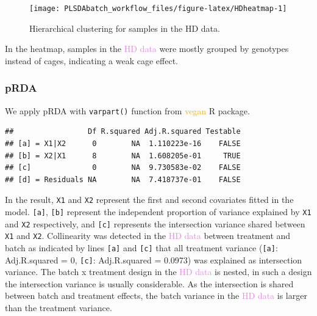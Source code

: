 \documentclass[
]{book}
\newenvironment{Shaded}{\begin{snugshade}}{\end{snugshade}}
\newcommand{\AttributeTok}[1]{\textcolor[rgb]{0.77,0.63,0.00}{#1}}
\newcommand{\FunctionTok}[1]{\textcolor[rgb]{0.00,0.00,0.00}{#1}}
\newcommand{\NormalTok}[1]{#1}
\newcommand{\OtherTok}[1]{\textcolor[rgb]{0.56,0.35,0.01}{#1}}
\newcommand{\SpecialCharTok}[1]{\textcolor[rgb]{0.00,0.00,0.00}{#1}}
\begin{document}
\begin{figure}

{\centering \texttt{[image: PLSDAbatch\_workflow\_files/figure-latex/HDheatmap-1]} 

}

\caption{Hierarchical clustering for samples in the HD data.}\label{fig:HDheatmap}
\end{figure}

In the heatmap, samples in the \textcolor{violet}{HD data} were mostly grouped by genotypes instead of cages, indicating a weak cage effect.

\hypertarget{prda-3}{%
\subsubsection{pRDA}\label{prda-3}}

We apply pRDA with \texttt{varpart()} function from \textcolor{orange}{vegan} R package.

\begin{Shaded}
\end{Shaded}

\begin{verbatim}
##                 Df R.squared Adj.R.squared Testable
## [a] = X1|X2      0        NA  1.110223e-16    FALSE
## [b] = X2|X1      8        NA  1.608205e-01     TRUE
## [c]              0        NA  9.730583e-02    FALSE
## [d] = Residuals NA        NA  7.418737e-01    FALSE
\end{verbatim}

In the result, \texttt{X1} and \texttt{X2} represent the first and second covariates fitted in the model. \texttt{{[}a{]}}, \texttt{{[}b{]}} represent the independent proportion of variance explained by \texttt{X1} and \texttt{X2} respectively, and \texttt{{[}c{]}} represents the intersection variance shared between \texttt{X1} and \texttt{X2}. Collinearity was detected in the \textcolor{violet}{HD data} between treatment and batch as indicated by lines \texttt{{[}a{]}} and \texttt{{[}c{]}} that all treatment variance (\texttt{{[}a{]}}: Adj.R.squared = 0, \texttt{{[}c{]}}: Adj.R.squared = 0.0973) was explained as intersection variance. The batch x treatment design in the \textcolor{violet}{HD data} is nested, in such a design the intersection variance is usually considerable. As the intersection is shared between batch and treatment effects, the batch variance in the \textcolor{violet}{HD data} is larger than the treatment variance.
\end{document}
